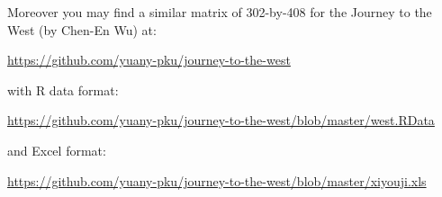 \documentclass[11pt]{article}
\begin{document}
Moreover you may find a similar matrix of 302-by-408 for the Journey to the West (by Chen-En Wu) at:

\url{https://github.com/yuany-pku/journey-to-the-west}

\noindent with R data format:

\url{https://github.com/yuany-pku/journey-to-the-west/blob/master/west.RData}

\noindent and Excel format:

\url{https://github.com/yuany-pku/journey-to-the-west/blob/master/xiyouji.xls}




%
%
% 
%
%
%
%
%
%
\end{document}
